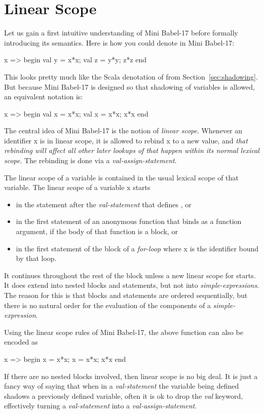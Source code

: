 \documentclass{llncs}
\begin{document}
\section{Linear Scope}
Let us gain a first intuitive understanding of Mini Babel-17 before formally introducing its semantics.
Here is how you could denote  in Mini Babel-17:
\begin{babellisting}
x => begin val y = x*x; val z = y*y; z*z end
\end{babellisting}
This looks pretty much like the Scala denotation of   from Section~\ref{sec:shadowing}.
But because Mini Babel-17 is designed so that shadowing of variables is allowed, an equivalent notation is:
\begin{babellisting}
x => begin val x = x*x; val x = x*x; x*x end
\end{babellisting}
The central idea of Mini Babel-17 is the notion of \emph{linear scope}. Whenever an identifier x is in linear scope, it is allowed to rebind 
x to a new value, and \emph{that rebinding will affect all other \emph{later} lookups of  that happen within its normal lexical scope}. The rebinding is done via a \emph{val-assign-statement}.

The linear scope of a variable is contained in the usual lexical scope of that variable.
The linear scope of a variable x starts 
\begin{itemize}
\item in the statement after the \emph{val-statement} that defines , or 
\item in the first statement of an anonymous function that binds  as a function argument, if the body of that function is a block, or
\item in the first statement of the block of a \emph{for-loop} where x is the identifier bound by that loop.
\end{itemize}
It continues throughout the rest of the block unless a new linear scope for  starts. It does extend into nested blocks and statements, but not into \emph{simple-expressions}. The reason for this is that blocks and statements are ordered sequentially, but there is no natural order for the evaluation of the components of a \emph{simple-expression}. 

Using the linear scope rules of Mini Babel-17, the above function can also be encoded as
\begin{babellisting}
x => begin x = x*x; x = x*x; x*x end 
\end{babellisting}

If there are no nested blocks involved, then linear scope is no big deal. It is just a fancy way of saying that when in a \emph{val-statement} the variable being defined shadows a previously defined variable, often it is ok to drop the \emph{val} keyword, effectively turning a \emph{val-statement} into a \emph{val-assign-statement}. 
\end{document}
